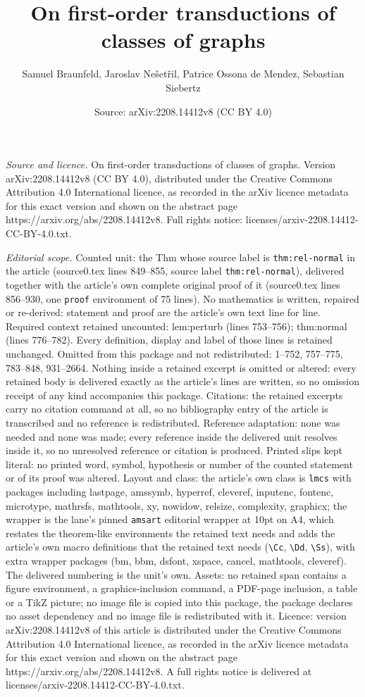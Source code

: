 \documentclass[10pt,a4paper]{amsart}
\title[On first-order transductions of classes of graphs]{On first-order transductions of classes of graphs}
\author{Samuel Braunfeld, Jaroslav Ne\v{s}et\v{r}il, Patrice Ossona de Mendez, Sebastian Siebertz}
\date{Source: arXiv:2208.14412v8 (CC BY 4.0)}
\begin{document}
\maketitle

\noindent\emph{Source and licence.} On first-order transductions of classes of graphs. Version arXiv:2208.14412v8 (CC BY 4.0), distributed under the Creative Commons Attribution 4.0 International licence, as recorded in the arXiv licence metadata for this exact version and shown on the abstract page https://arxiv.org/abs/2208.14412v8. Full rights notice: licenses/arxiv-2208.14412-CC-BY-4.0.txt.\par\smallskip

\noindent\textit{Editorial scope.} Counted unit: the Thm whose source label is \texttt{thm:rel-normal} in the article (source0.tex lines 849--855, source label \texttt{thm:rel-normal}), delivered together with the article's own complete original proof of it (source0.tex lines 856--930, one \texttt{proof} environment of 75 lines). No mathematics is written, repaired or re-derived: statement and proof are the article's own text line for line. Required context retained uncounted: lem:perturb (lines 753--756); thm:normal (lines 776--782). Every definition, display and label of those lines is retained unchanged. Omitted from this package and not redistributed: 1--752, 757--775, 783--848, 931--2664. Nothing inside a retained excerpt is omitted or altered: every retained body is delivered exactly as the article's lines are written, so no omission receipt of any kind accompanies this package. Citations: the retained excerpts carry no citation command at all, so no bibliography entry of the article is transcribed and no reference is redistributed. Reference adaptation: none was needed and none was made; every reference inside the delivered unit resolves inside it, so no unresolved reference or citation is produced. Printed slips kept literal: no printed word, symbol, hypothesis or number of the counted statement or of its proof was altered. Layout and class: the article's own class is \texttt{lmcs} with packages including lastpage, amssymb, hyperref, cleveref, inputenc, fontenc, microtype, mathrsfs, mathtools, xy, nowidow, relsize, complexity, graphicx; the wrapper is the lane's pinned \texttt{amsart} editorial wrapper at 10pt on A4, which restates the theorem-like environments the retained text needs and adds the article's own macro definitions that the retained text needs (\texttt{\textbackslash Cc}, \texttt{\textbackslash Dd}, \texttt{\textbackslash Ss}), with extra wrapper packages (bm, bbm, dsfont, xspace, cancel, mathtools, cleveref). The delivered numbering is the unit's own. Assets: no retained span contains a figure environment, a graphics-inclusion command, a PDF-page inclusion, a table or a TikZ picture; no image file is copied into this package, the package declares no asset dependency and no image file is redistributed with it. Licence: version arXiv:2208.14412v8 of this article is distributed under the Creative Commons Attribution 4.0 International licence, as recorded in the arXiv licence metadata for this exact version and shown on the abstract page https://arxiv.org/abs/2208.14412v8. A full rights notice is delivered at licenses/arxiv-2208.14412-CC-BY-4.0.txt. 
\end{document}

